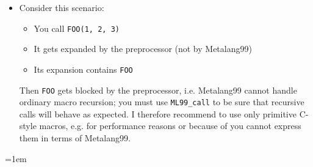 \documentclass[12pt]{article}
\theoremstyle{break}
\begin{document}
\begin{itemize}
\item Consider this scenario:
    \begin{itemize}
        \item You call \texttt{FOO(1, 2, 3)}
        \item It gets expanded by the preprocessor (not by Metalang99)
        \item Its expansion contains \texttt{FOO}
    \end{itemize}
Then \texttt{FOO} gets blocked \cite{Blueprinting} by the preprocessor, i.e. Metalang99 cannot handle ordinary
macro recursion; you must use \texttt{ML99\_call} to be sure that recursive calls
will behave as expected. I therefore recommend to use only primitive C-style macros, e.g.
for performance reasons or because of you cannot express them in terms of Metalang99.
\end{itemize}

\emergencystretch=1em
\printbibliography
\end{document}
